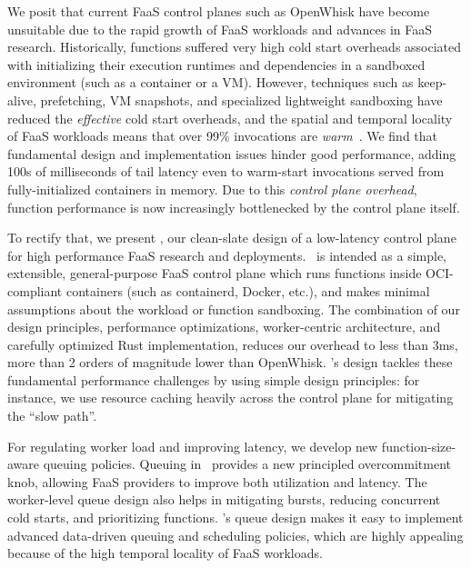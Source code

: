 We posit that current FaaS control planes such as OpenWhisk have become unsuitable due to the rapid growth of FaaS workloads and advances in FaaS research.
Historically, functions suffered very high cold start overheads associated with initializing their execution runtimes and dependencies in a sandboxed environment (such as a container or a VM).
However, techniques such as keep-alive, prefetching, VM snapshots, and specialized lightweight sandboxing have reduced the \emph{effective} cold start overheads, and the spatial and temporal locality of FaaS workloads means that over 99\% invocations are \emph{warm}~\cite{faascache-asplos21}.
We find that fundamental design and implementation issues hinder good performance, adding 100s of milliseconds of tail latency even to warm-start invocations served from fully-initialized containers in memory. 
Due to this \emph{control plane overhead}, function performance is now increasingly bottlenecked by the control plane itself.


To rectify that, we present \sysname, our clean-slate design of a low-latency control plane for high performance FaaS research and deployments.
\sysname~is intended as a simple, extensible, general-purpose FaaS control plane which runs functions inside OCI-compliant containers (such as containerd, Docker, etc.), and makes minimal assumptions about the workload or function sandboxing.
The combination of our design principles, performance optimizations, worker-centric architecture, and carefully optimized Rust implementation, reduces our overhead to less than 3ms, more than 2 orders of magnitude lower than OpenWhisk. 
\sysname's design tackles these fundamental performance challenges by using simple design principles: for instance, we use resource caching heavily across the control plane for mitigating the ``slow path''. 


For regulating worker load and improving latency, we develop new function-size-aware queuing policies.
Queuing in \sysname~provides a new principled overcommitment knob, allowing FaaS providers to improve both utilization and latency.
The worker-level queue design also helps in mitigating bursts, reducing concurrent cold starts, and prioritizing functions. 
\sysname's queue design makes it easy to implement advanced data-driven queuing and scheduling policies, which are highly appealing because of the high temporal locality of FaaS workloads. 



